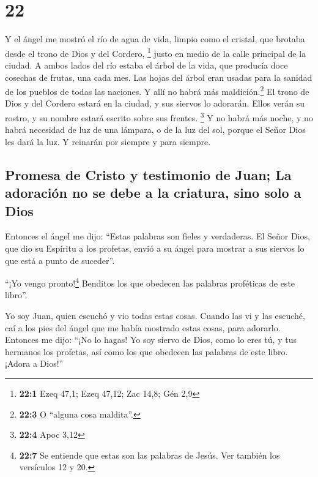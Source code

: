 \hypertarget{section-21}{%
\section{22}\label{section-21}}

 Y el ángel me mostró el río de agua de vida, limpio como
el cristal, que brotaba desde el trono de Dios y del Cordero,
\footnote{\textbf{22:1} Ezeq 47,1; Ezeq 47,12; Zac 14,8; Gén 2,9}
 justo en medio de la calle principal de la ciudad. A
ambos lados del río estaba el árbol de la vida, que producía doce
cosechas de frutas, una cada mes. Las hojas del árbol eran usadas para
la sanidad de los pueblos de todas las naciones.  Y allí
no habrá más maldición.\footnote{\textbf{22:3} O ``alguna cosa
  maldita''.} El trono de Dios y del Cordero estará en la ciudad, y sus
siervos lo adorarán.  Ellos verán su rostro, y su nombre
estará escrito sobre sus frentes. \footnote{\textbf{22:4} Apoc 3,12}
 Y no habrá más noche, y no habrá necesidad de luz de una
lámpara, o de la luz del sol, porque el Señor Dios les dará la luz. Y
reinarán por siempre y para siempre.

\hypertarget{promesa-de-cristo-y-testimonio-de-juan-la-adoraciuxf3n-no-se-debe-a-la-criatura-sino-solo-a-dios}{%
\subsection{Promesa de Cristo y testimonio de Juan; La adoración no se
debe a la criatura, sino solo a
Dios}\label{promesa-de-cristo-y-testimonio-de-juan-la-adoraciuxf3n-no-se-debe-a-la-criatura-sino-solo-a-dios}}

 Entonces el ángel me dijo: ``Estas palabras son fieles y
verdaderas. El Señor Dios, que dio su Espíritu a los profetas, envió a
su ángel para mostrar a sus siervos lo que está a punto de suceder''.

 ``¡Yo vengo pronto!\footnote{\textbf{22:7} Se entiende
  que estas son las palabras de Jesús. Ver también los versículos 12 y
  20.} Benditos los que obedecen las palabras proféticas de este
libro''.

 Yo soy Juan, quien escuchó y vio todas estas cosas.
Cuando las vi y las escuché, caí a los pies del ángel que me había
mostrado estas cosas, para adorarlo.  Entonces me dijo:
``¡No lo hagas! Yo soy siervo de Dios, como lo eres tú, y tus hermanos
los profetas, así como los que obedecen las palabras de este libro.
¡Adora a Dios!''

